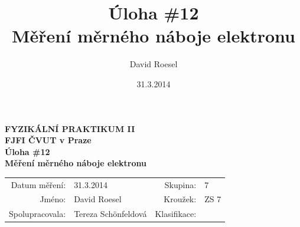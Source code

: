 \documentclass[english]{article}
\newcommand{\Author}{David Roesel}
\newcommand{\Coauthor}{Tereza Schönfeldová}
\newcommand{\Institute}{FJFI ČVUT v Praze}
\newcommand{\Subject}{FYZIKÁLNÍ PRAKTIKUM II}
\newcommand{\Group}{7}
\newcommand{\Circle}{ZS 7}
\newcommand{\Title}{Úloha \#12  \\Měření měrného náboje elektronu}
\newcommand{\Date}{31.3.2014}
\begin{document}
\author{\Author}
\title{\Title}
\date{\Date}

\renewcommand{\figurename}{Obr.}
\renewcommand{\tablename}{Tab.}
\renewcommand{\refname}{Reference}


\setlength{\parindent}{0cm}
\begin{multicols}{2}
\textbf{\Subject \\
        \Institute \\[0.1cm]
\Title \\[0.5cm]
}
\begin{tabular}{rlrl}
\large Datum měření: & \Date & \large Skupina: & \Group \\
\large Jméno: & \Author & \large Kroužek:  & \Circle\\
\large Spolupracovala: & \Coauthor &\large Klasifikace:\\
\end{tabular}


\end{multicols}
\end{document}
